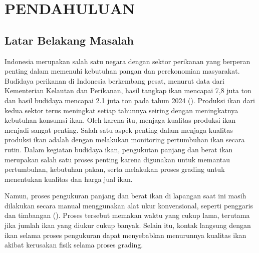 
\chapter{PENDAHULUAN}

\section{Latar Belakang Masalah}

Indonesia merupakan salah satu negara dengan sektor perikanan yang berperan penting dalam memenuhi kebutuhan pangan dan perekonomian masyarakat. 
Budidaya perikanan di Indonesia berkembang pesat, menurut data dari Kementerian Kelautan dan Perikanan, hasil tangkap ikan mencapai 7,8 juta ton dan hasil budidaya mencapai 2.1 juta ton pada tahun 2024 (\cite{KKP2024}). 
Produksi ikan dari kedua sektor terus meningkat setiap tahunnya seiring dengan meningkatnya kebutuhan konsumsi ikan. Oleh karena itu, menjaga kualitas produksi ikan menjadi sangat penting. Salah satu aspek penting dalam menjaga kualitas produksi ikan adalah dengan melakukan monitoring pertumbuhan ikan secara rutin.
Dalam kegiatan budidaya ikan, pengukutan panjang dan berat ikan merupakan salah satu proses penting karena digunakan untuk memantau pertumbuhan, kebutuhan pakan, serta melakukan proses grading untuk menentukan kualitas dan harga jual ikan.

Namun, proses pengukuran panjang dan berat ikan di lapangan saat ini masih dilakukan secara manual menggunakan alat ukur konvensional, seperti penggaris dan timbangan (\cite{Amri2020}).
Proses tersebut memakan waktu yang cukup lama, terutama jika jumlah ikan yang diukur cukup banyak. Selain itu, kontak langsung dengan ikan selama proses pengukuran dapat menyebabkan menurunnya kualitas ikan akibat kerusakan fisik selama proses grading.

